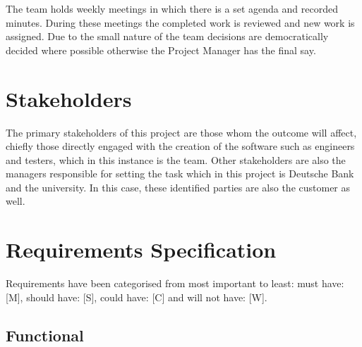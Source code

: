 \documentclass[9pt]{article} %
\begin{document}
	The team holds weekly meetings in which there is a set agenda and recorded minutes. During these meetings the completed work is reviewed and new work is assigned. Due to the small nature of the team decisions are democratically decided where possible otherwise the Project Manager has the final say. 
	
	\section{Stakeholders}
	The primary stakeholders of this project are those whom the outcome will affect, chiefly those directly engaged with the creation of the software such as engineers and testers, which in this instance is the team. Other stakeholders are also the managers responsible for setting the task which in this project is Deutsche Bank and the university. In this case, these identified parties are also the customer as well.

	\section{Requirements Specification}
	Requirements have been categorised from most important to least: must have: [M], should have: [S], could have: [C] and will not have: [W].
	\subsection{Functional}
	
	\setlength{\LTpre}{0pt}
	\setlength{\LTpost}{0pt}
	
\end{document}

